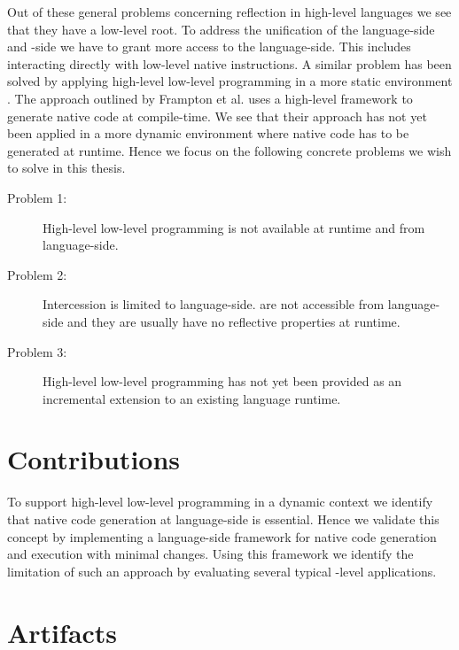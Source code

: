 \noindent Out of these general problems concerning reflection in high-level languages we see that they have a low-level root.
To address the unification of the language-side and \VM-side we have to grant more access to the language-side.
This includes interacting directly with low-level native instructions.
A similar problem has been solved by applying high-level low-level programming in a more static environment \cite{Fram09a,Graal}.
The approach outlined by Frampton et al. uses a high-level framework to generate native code at compile-time.
We see that their approach has not yet been applied in a more dynamic environment where native code has to be generated at runtime.
Hence we focus on the following concrete problems we wish to solve in this thesis.

\begin{description}
	\item[Problem 1:] High-level low-level programming is not available at runtime and from language-side.
	
	\item[Problem 2:] Intercession is limited to language-side.
	\VMs are not accessible from language-side and they are usually have no reflective properties at runtime.
	
	\item[Problem 3:] High-level low-level programming has not yet been provided as an incremental extension to an existing language runtime.
\end{description}

\section{Contributions}

To support high-level low-level programming in a dynamic context we identify that native code generation at language-side is essential.
Hence we validate this concept by implementing a language-side framework for native code generation and execution with minimal \VM changes.
Using this framework we identify the limitation of such an approach by evaluating several typical \VM-level applications.


\section{Artifacts}

